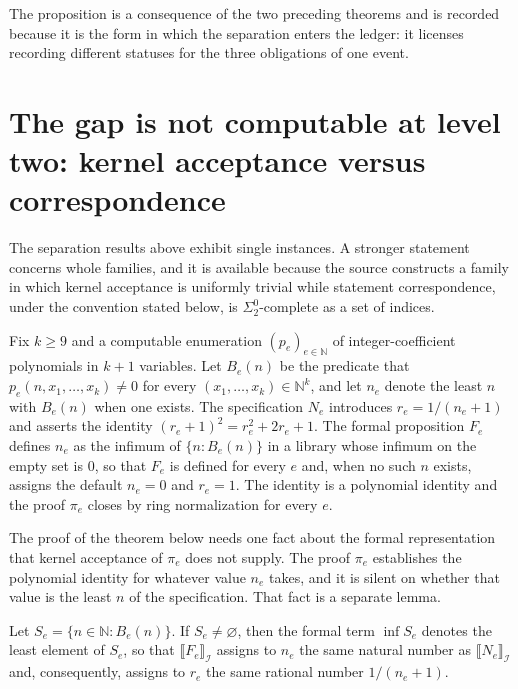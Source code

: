 The proposition is a consequence of the two preceding theorems and is recorded because it is the form in which the separation enters the ledger: it licenses recording different statuses for the three obligations of one event.

\section[The gap is not computable]{The gap is not computable at level two: kernel acceptance versus correspondence}

The separation results above exhibit single instances. A stronger statement concerns whole families, and it is available because the source constructs a family in which kernel acceptance is uniformly trivial while statement correspondence, under the convention stated below, is $\Sigma^0_2$-complete as a set of indices.

Fix $k \ge 9$ and a computable enumeration $(p_e)_{e \in \mathbb{N}}$ of integer-coefficient polynomials in $k+1$ variables. Let $B_e(n)$ be the predicate that $p_e(n, x_1, \dots, x_k) \ne 0$ for every $(x_1, \dots, x_k) \in \mathbb{N}^k$, and let $n_e$ denote the least $n$ with $B_e(n)$ when one exists. The specification $N_e$ introduces $r_e = 1/(n_e+1)$ and asserts the identity $(r_e+1)^2 = r_e^2 + 2r_e + 1$. The formal proposition $F_e$ defines $n_e$ as the infimum of $\{n : B_e(n)\}$ in a library whose infimum on the empty set is $0$, so that $F_e$ is defined for every $e$ and, when no such $n$ exists, assigns the default $n_e = 0$ and $r_e = 1$. The identity is a polynomial identity and the proof $\pi_e$ closes by ring normalization for every $e$.

The proof of the theorem below needs one fact about the formal representation that kernel acceptance of $\pi_e$ does not supply. The proof $\pi_e$ establishes the polynomial identity for whatever value $n_e$ takes, and it is silent on whether that value is the least $n$ of the specification. That fact is a separate lemma.

\begin{lemma}
\label{lem:sinf}
Let $S_e = \{n \in \mathbb{N} : B_e(n)\}$. If $S_e \neq \varnothing$, then the formal term $\inf S_e$ denotes the least element of $S_e$, so that $\llbracket F_e \rrbracket_{\mathcal{I}}$ assigns to $n_e$ the same natural number as $\llbracket N_e \rrbracket_{\mathcal{I}}$ and, consequently, assigns to $r_e$ the same rational number $1/(n_e+1)$.
\end{lemma}

